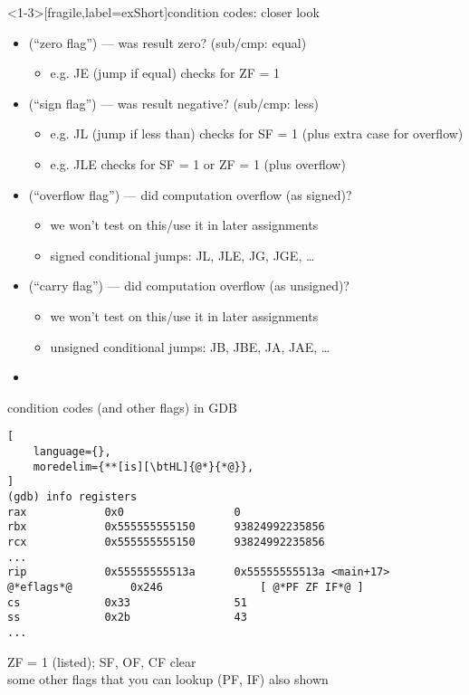 \begin{frame}<1-3>[fragile,label=exShort]{condition codes: closer look}
\begin{itemize}
    \item \xZF (``zero flag'') --- was result zero? (sub/cmp: equal)
        \begin{itemize}
        \item e.g. JE (jump if equal) checks for ZF = 1
        \end{itemize}
    \item \xSF (``sign flag'') --- was result negative? (sub/cmp: less)
        \begin{itemize}
        \item e.g. JL (jump if less than) checks for SF = 1 (plus extra case for overflow)
        \item e.g. JLE checks for SF = 1 or ZF = 1 (plus overflow)
        \end{itemize}
    \item<2-> \xOF (``overflow flag'') --- did computation overflow (as signed)?
        \begin{itemize}
        \item<2-> we won't test on this/use it in later assignments
        \item<2-> signed conditional jumps: JL, JLE, JG, JGE, \ldots
        \end{itemize}
    \item<2-> \xCF (``carry flag'') --- did computation overflow (as unsigned)?
        \begin{itemize}
        \item<2-> we won't test on this/use it in later assignments
        \item<2-> unsigned conditional jumps: JB, JBE, JA, JAE, \ldots
        \end{itemize}
    \item {}
\end{itemize}
\end{frame}

\begin{frame}[fragile,label=ccGdbEx]{condition codes (and other flags) in GDB}
\begin{lstlisting}[
    language={},
    moredelim={**[is][\btHL]{@*}{*@}},
]
(gdb) info registers
rax            0x0                 0
rbx            0x555555555150      93824992235856
rcx            0x555555555150      93824992235856
...
rip            0x55555555513a      0x55555555513a <main+17>
@*eflags*@         0x246               [ @*PF ZF IF*@ ]
cs             0x33                51
ss             0x2b                43
...
\end{lstlisting}
ZF = 1 (listed); SF, OF, CF clear \\
some other flags that you can lookup (PF, IF) also shown
\end{frame}
